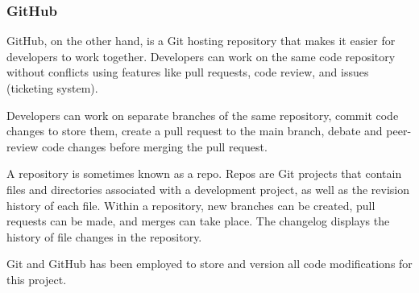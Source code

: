 \subsubsection{GitHub}
GitHub, on the other hand, is a Git hosting repository that makes it easier for developers to work together. Developers can work on the same code repository without conflicts using features like pull requests, code review, and issues (ticketing system).

Developers can work on separate branches of the same repository, commit code changes to store them, create a pull request to the main branch, debate and peer-review code changes before merging the pull request.

A repository is sometimes known as a repo. Repos are Git projects that contain files and directories associated with a development project, as well as the revision history of each file. Within a repository, new branches can be created, pull requests can be made, and merges can take place. The changelog displays the history of file changes in the repository.

Git and GitHub has been employed to store and version all code modifications for this project.

